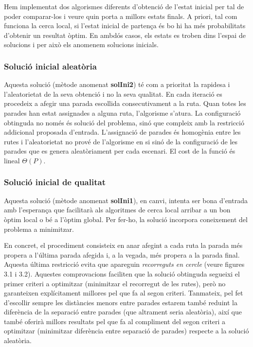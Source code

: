 
Hem implementat dos algorismes diferents d'obtenció de l'estat inicial per tal de poder comparar-los i veure quin porta a millors estats finals. A priori, tal com funciona la cerca local, si l'estat inicial de partença és bo hi ha més probabilitats d'obtenir un resultat òptim.  En ambdós casos, els estats es troben dins l'espai de solucions i per això els anomenem solucions inicials.

\subsubsection{Solució inicial aleatòria}

Aquesta solució (mètode anomenat \textbf{solIni2}) té com a prioritat la rapidesa i l'aleatorietat de la seva obtenció i no la seva qualitat. En cada iteració es procedeix a afegir una parada escollida consecutivament a la ruta. Quan totes les parades han estat assignades a alguna ruta, l'algorisme s'atura. La configuració obtinguda no només és solució del problema, sinó que compleix amb la restricció addicional proposada d'entrada. L'assignació de parades és homogènia entre les rutes i l'aleatorietat no prové de l'algorisme en si sinó de la configuració de les parades que es genera aleatòriament per cada escenari. El cost de la funció és lineal $\Theta(P)$.

\subsubsection{Solució inicial de qualitat}

Aquesta solució (mètode anomenat \textbf{solIni1}), en canvi, intenta ser bona d'entrada amb l'esperança que facilitarà als algoritmes de cerca local arribar a un bon òptim local o bé a l'òptim global. Per fer-ho, la solució incorpora coneixement del problema a minimitzar. 

En concret, el procediment consisteix en anar afegint a cada ruta la parada més propera a l'última parada afegida i, a la vegada, més propera a la parada final. Aquesta última restricció evita que apareguin \emph{recorreguts en cercle} (veure figures 3.1 i 3.2). Aquestes comprovacions faciliten que la solució obtinguda segueixi el primer criteri a optimitzar (minimitzar el recorregut de les rutes), però no garanteixen explícitament millores pel que fa al segon criteri. Tanmateix, pel fet d'escollir sempre les distàncies menors entre parades estarem també reduint la diferència de la separació entre parades (que altrament seria aleatòria), així que també oferirà millors resultats pel que fa al compliment del segon criteri a optimitzar (minimitzar diferència entre separació de parades) respecte a la solució aleatòria.

